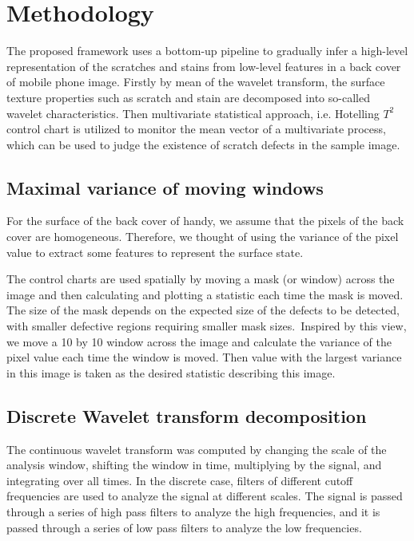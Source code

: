 \chapter{Methodology}
\label{cp:Methodology}

  The proposed framework uses a bottom-up pipeline to
gradually infer a high-level representation of the scratches and stains from low-level features in a back cover of mobile phone image. Firstly by mean of the wavelet transform, the surface texture properties such as scratch and stain are decomposed into so-called wavelet characteristics. Then multivariate statistical approach, i.e. Hotelling $T^{2}$ control chart is utilized to monitor the mean vector of a multivariate process, which can be used to judge the existence of scratch defects in the sample image.

\section{Maximal variance of moving windows}
For the surface of the back cover of handy, we assume that the pixels of the back cover are homogeneous. Therefore, we thought of using the variance of the pixel value to extract some features to represent the surface state. 


The control charts are used spatially by moving a mask (or window) across the image and then calculating and plotting a statistic each time the mask is moved. The size of the mask depends on the expected size of the defects to be detected, with smaller defective regions requiring smaller mask sizes.~\cite{megahed2011review}Inspired by this view, we move a 10 by 10 window across the image and calculate the variance of the pixel value each time the window is moved. Then value with the largest variance in this image is taken as the desired statistic describing this image.

\section{Discrete Wavelet transform decomposition}
  The continuous wavelet transform was computed by changing the scale of the analysis window, shifting the window in time, multiplying by the signal, and integrating over all times. In the discrete case, filters of different cutoff frequencies are used to analyze the signal at different scales. The signal is passed through a series of high pass filters to analyze the high frequencies, and it is passed through a series of low pass filters to analyze the low frequencies.


